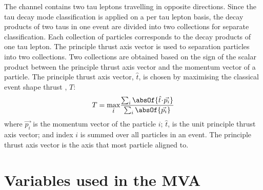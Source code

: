







The \eeToTauTau channel contains two tau leptons travelling in opposite directions. Since the tau decay mode classification is applied on a per tau lepton basis, the decay products of two taus in one event are divided into two collections for separate classification. Each collection of particles corresponds  to the decay products of one tau lepton.
The principle thrust axis vector is used to separation particles into two collections. Two collections are obtained based on the sign of the scalar product between the principle thrust axis vector  and the momentum vector of a particle. The principle thrust axis vector, $\hat{t}$, is chosen by maximising the classical event shape thrust \cite{PhysRevLett.39.1587}, $T$:
\begin{equation}
T = \max_{\hat{t}}\!\frac{\sum_{i}\absOf{\hat{t}\!\cdot\!\vec{p_{i}}}}{\sum_{i}\absOf{\vec{p_{i}}}}
\end{equation}
where $\vec{p_{i}}$ is the momentum vector of the particle $i$;   $\hat{t}$, is the unit principle thrust axis vector; and index $i$ is summed over all particles in an event. The principle thrust axis vector is the axis that most particle aligned to.


\section{Variables used in the MVA}
\label{sec:tauVar}


